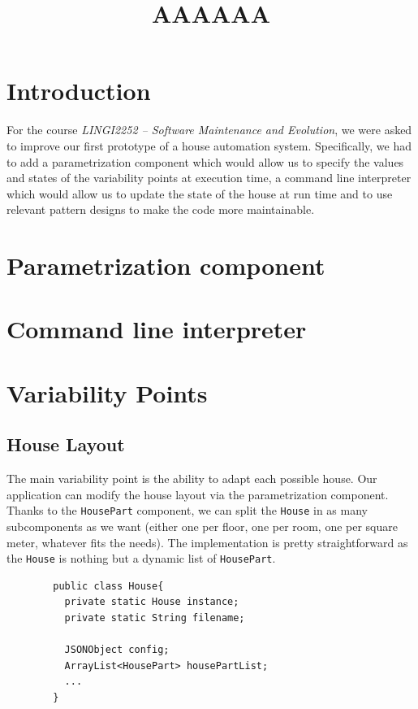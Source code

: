     \title{AAAAAA}
    \newpage

	\section{Introduction}
		For the course \textit{LINGI2252 -- Software Maintenance and Evolution}, we were asked to improve our first prototype of a house automation system. Specifically, we had to add a parametrization component which would allow us to specify the values and states of the variability points at execution time, a command line interpreter which would allow us to update the state of the house at run time and to use relevant pattern designs to make the code more maintainable.

	\section{Parametrization component}

	\section{Command line interpreter}

  \section{Variability Points}
    \subsection{House Layout}
      The main variability point is the ability to adapt each possible house. Our application can modify the house layout via the parametrization component. Thanks to the \texttt{HousePart} component, we can split the \texttt{House} in as many subcomponents as we want (either one per floor, one per room, one per square meter, whatever fits the needs). The implementation is pretty straightforward as the \texttt{House} is nothing but a dynamic list of \texttt{HousePart}.
      \begin{verbatim}
        public class House{
          private static House instance;
          private static String filename;

          JSONObject config;
          ArrayList<HousePart> housePartList;
          ...
        }
      \end{verbatim}

